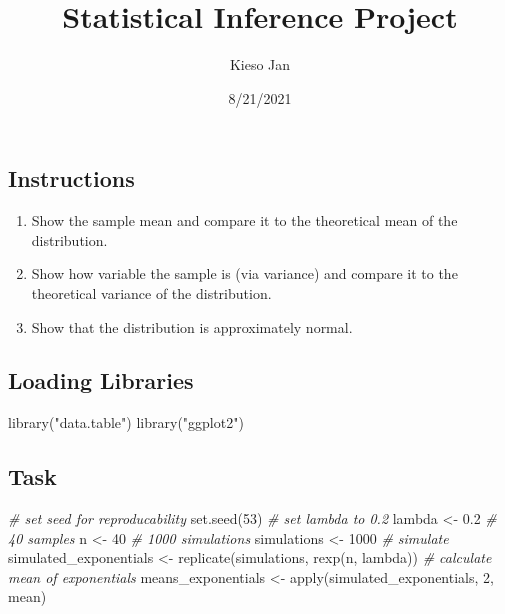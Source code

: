 \documentclass[
]{article}
\title{Statistical Inference Project}
\author{Kieso Jan}
\date{8/21/2021}
\newenvironment{Shaded}{\begin{snugshade}}{\end{snugshade}}
\newcommand{\CommentTok}[1]{\textcolor[rgb]{0.56,0.35,0.01}{\textit{#1}}}
\newcommand{\DecValTok}[1]{\textcolor[rgb]{0.00,0.00,0.81}{#1}}
\newcommand{\FloatTok}[1]{\textcolor[rgb]{0.00,0.00,0.81}{#1}}
\newcommand{\FunctionTok}[1]{\textcolor[rgb]{0.00,0.00,0.00}{#1}}
\newcommand{\NormalTok}[1]{#1}
\newcommand{\OtherTok}[1]{\textcolor[rgb]{0.56,0.35,0.01}{#1}}
\newcommand{\StringTok}[1]{\textcolor[rgb]{0.31,0.60,0.02}{#1}}
\providecommand{\tightlist}{%
  \setlength{\itemsep}{0pt}\setlength{\parskip}{0pt}}
\begin{document}
\maketitle

\hypertarget{instructions}{%
\subsection{Instructions}\label{instructions}}

\begin{enumerate}
\def\labelenumi{\arabic{enumi}.}
\tightlist
\item
  Show the sample mean and compare it to the theoretical mean of the
  distribution.
\item
  Show how variable the sample is (via variance) and compare it to the
  theoretical variance of the distribution.
\item
  Show that the distribution is approximately normal.
\end{enumerate}

\hypertarget{loading-libraries}{%
\subsection{Loading Libraries}\label{loading-libraries}}

\begin{Shaded}
\begin{Highlighting}[]
\FunctionTok{library}\NormalTok{(}\StringTok{"data.table"}\NormalTok{)}
\FunctionTok{library}\NormalTok{(}\StringTok{"ggplot2"}\NormalTok{)}
\end{Highlighting}
\end{Shaded}

\hypertarget{task}{%
\subsection{Task}\label{task}}

\begin{Shaded}
\begin{Highlighting}[]
\CommentTok{\# set seed for reproducability}
\FunctionTok{set.seed}\NormalTok{(}\DecValTok{53}\NormalTok{)}
\CommentTok{\# set lambda to 0.2}
\NormalTok{lambda }\OtherTok{\textless{}{-}} \FloatTok{0.2}
\CommentTok{\# 40 samples}
\NormalTok{n }\OtherTok{\textless{}{-}} \DecValTok{40}
\CommentTok{\# 1000 simulations}
\NormalTok{simulations }\OtherTok{\textless{}{-}} \DecValTok{1000}
\CommentTok{\# simulate}
\NormalTok{simulated\_exponentials }\OtherTok{\textless{}{-}} \FunctionTok{replicate}\NormalTok{(simulations, }\FunctionTok{rexp}\NormalTok{(n, lambda))}
\CommentTok{\# calculate mean of exponentials}
\NormalTok{means\_exponentials }\OtherTok{\textless{}{-}} \FunctionTok{apply}\NormalTok{(simulated\_exponentials, }\DecValTok{2}\NormalTok{, mean)}
\end{Highlighting}
\end{Shaded}
\end{document}
